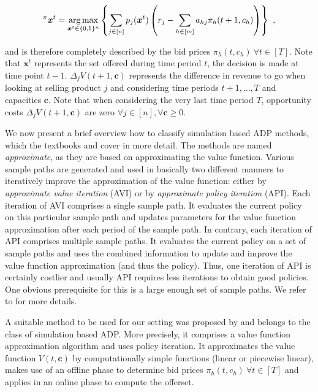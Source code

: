\begin{align}
^\pi \boldsymbol{x}^t = \operatorname*{arg\,max}_{\boldsymbol{x}^t \in \{0,1\}^n}\left\{ \sum_{j \in [n]} p_j(\boldsymbol{x}^t) \left( r_j - \sum_{h \in [m]} a_{hj}\pi_{h}(t+1, c_h) \right) \right\}~,\label{eq:ADP-online}
\end{align}

and is therefore completely described by the bid prices $\pi_h(t, c_h) ~\forall t \in [T]$. Note that $\boldsymbol{x}^t$ represents the set offered during time period $t$, \ie the decision is made at time point $t-1$. $\Delta_j V(t+1, \boldsymbol{c})$ represents the difference in revenue to go when looking at selling product $j$ and considering time periods $t+1, \dots, T$ and capacities $\boldsymbol{c}$. Note that when considering the very last time period $T$, opportunity costs $\Delta_j V(t+1, \boldsymbol{c})$ are zero $\forall j \in [n], \forall \boldsymbol{c} \geq 0$.

We now present a brief overview how to classify simulation based ADP methods, which the textbooks \cite{Bertsekas.2005} and \cite{Powell.2011} cover in more detail. The methods are named \emph{approximate}, as they are based on approximating the value function. Various sample paths are generated and used in basically two different manners to iteratively improve the approximation of the value function: either by \emph{approximate value iteration} (AVI) or by \emph{approximate policy iteration} (API). Each iteration of AVI comprises a single sample path. It evaluates the current policy on this particular sample path and updates parameters for the value function approximation after each period of the sample path. In contrary, each iteration of API  comprises multiple sample paths. It evaluates the current policy on a set of sample paths and uses the combined information to update and improve the value function approximation (and thus the policy). Thus, one iteration of API is certainly costlier and usually API requires less iterations to obtain good policies. One obvious prerequisite for this is a large enough set of sample paths. We refer to \cite{Powell.2011} for more details.

A suitable method to be used for our setting was proposed by \cite{Koch.2017} and belongs to the class of simulation based ADP. More precisely, it comprises a value function approximation algorithm and uses policy iteration. It approximates the value function $V(t, \boldsymbol{c})$ by computationally simple functions (linear or piecewise linear), makes use of an offline phase to determine bid prices $\pi_h(t, c_h) ~\forall t \in [T]$ and applies  in an online phase to compute the offerset.


